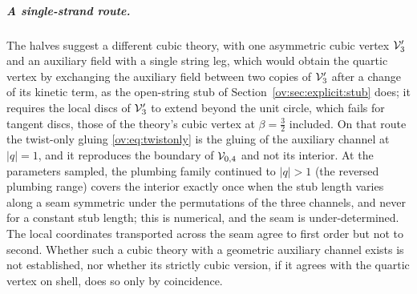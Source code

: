 \subparagraph{A single-strand route.}
The halves suggest a different cubic theory, with one asymmetric cubic vertex ${\mathcal{V}}_3'$ and an auxiliary field with a single string leg, which would obtain the quartic vertex by exchanging the auxiliary field between two copies of ${\mathcal{V}}_3'$ after a change of its kinetic term, as the open-string stub of Section~\ref{ov:sec:explicit:stub} does; it requires the local discs of ${\mathcal{V}}_3'$ to extend beyond the unit circle, which fails for tangent discs, those of the theory's cubic vertex at $\beta=\tfrac32$ included.
On that route the twist-only gluing \eqref{ov:eq:twistonly} is the gluing of the auxiliary channel at $|q|=1$, and it reproduces the boundary of ${\mathcal{V}}_{0,4}$ and not its interior.
At the parameters sampled, the plumbing family continued to $|q|>1$ (the reversed plumbing range) covers the interior exactly once when the stub length varies along a seam symmetric under the permutations of the three channels, and never for a constant stub length; this is numerical, and the seam is under-determined.
The local coordinates transported across the seam agree to first order but not to second.
Whether such a cubic theory with a geometric auxiliary channel exists is not established, nor whether its strictly cubic version, if it agrees with the quartic vertex on shell, does so only by coincidence.

